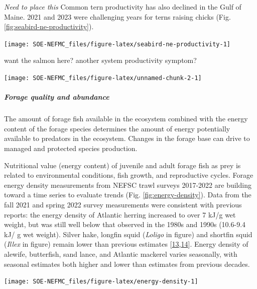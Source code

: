 \documentclass[
  10pt,
]{article}
\let\origfigure\figure
\let\endorigfigure\endfigure
\renewenvironment{figure}[1][2] {
    \expandafter\origfigure\expandafter[H]
} {
    \endorigfigure
}
\begin{document}
\emph{Need to place this} Common tern productivity has also declined in the Gulf of Maine. 2021 and 2023 were challenging years for terns raising chicks (Fig. \ref{fig:seabird-ne-productivity}).

\begin{figure}

{\centering \texttt{[image: SOE-NEFMC\_files/figure-latex/seabird-ne-productivity-1]} 

}

\caption{Productivity of Common terns in the Gulf of Maine.}\label{fig:seabird-ne-productivity}
\end{figure}

want the salmon here? another system productivity symptom?

\begin{center}\texttt{[image: SOE-NEFMC\_files/figure-latex/unnamed-chunk-2-1]} \end{center}

\hypertarget{forage-quality-and-abundance}{%
\subparagraph{Forage quality and abundance}\label{forage-quality-and-abundance}}

The amount of forage fish available in the ecosystem combined with the energy content of the forage species determines the amount of energy potentially available to predators in the ecosystem. Changes in the forage base can drive to managed and protected species production.

Nutritional value (energy content) of juvenile and adult forage fish as prey is related to environmental conditions, fish growth, and reproductive cycles. Forage energy density measurements from NEFSC trawl surveys 2017-2022 are building toward a time series to evaluate trends (Fig. \ref{fig:energy-density}). Data from the fall 2021 and spring 2022 survey measurements were consistent with previous reports: the energy density of Atlantic herring increased to over 7 kJ/g wet weight, but was still well below that observed in the 1980s and 1990s (10.6-9.4 kJ/ g wet weight). Silver hake, longfin squid (\emph{Loligo} in figure) and shortfin squid (\emph{Illex} in figure) remain lower than previous estimates {[}\protect\hyperlink{ref-steimle_energy_1985}{13},\protect\hyperlink{ref-lawson_important_1998}{14}{]}. Energy density of alewife, butterfish, sand lance, and Atlantic mackerel varies seasonally, with seasonal estimates both higher and lower than estimates from previous decades.\\

\begin{figure}

{\centering \texttt{[image: SOE-NEFMC\_files/figure-latex/energy-density-1]} 

}

\caption{Forage fish energy density mean and standard deviation by season and year, compared with 1980s (solid line; Steimle and Terranove 1985) and 1990s (dashed line; Lawson et al. 1998) values.}\label{fig:energy-density}
\end{figure}
\end{document}
